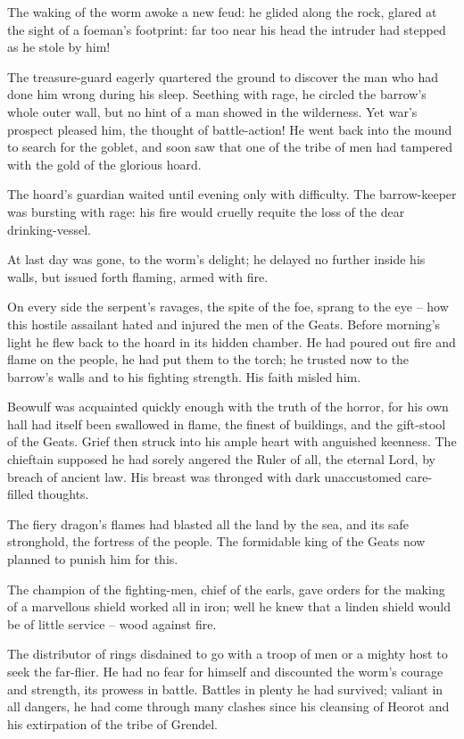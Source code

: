 \documentclass[a4paper]{article}
\begin{document}
{The waking of the worm awoke a new feud:
he glided along the rock, glared at the sight
of a foeman’s footprint: far too near his head
the intruder had stepped as he stole by him!

The treasure-guard eagerly
quartered the ground to discover the man
who had done him wrong during his sleep.
Seething with rage, he circled the barrow’s
whole outer wall, but no hint of a man
showed in the wilderness. Yet war’s prospect pleased him,
the thought of battle-action! He went back into the mound
to search for the goblet, and soon saw that one
of the tribe of men had tampered with the gold
of the glorious hoard.

The hoard’s guardian
waited until evening only with difficulty.
The barrow-keeper was bursting with rage:
his fire would cruelly requite the loss
of the dear drinking-vessel.

At last day was gone,
to the worm’s delight; he delayed no further
inside his walls, but issued forth flaming,
armed with fire.

On every side the serpent’s ravages,
the spite of the foe, sprang to the eye –
how this hostile assailant hated and injured
the men of the Geats. Before morning’s light
he flew back to the hoard in its hidden chamber.
He had poured out fire and flame on the people,
he had put them to the torch; he trusted now to the barrow’s walls
and to his fighting strength. His faith misled him.

Beowulf was acquainted quickly enough
with the truth of the horror, for his own hall had itself
been swallowed in flame, the finest of buildings,
and the gift-stool of the Geats. Grief then struck
into his ample heart with anguished keenness.
The chieftain supposed he had sorely angered
the Ruler of all, the eternal Lord,
by breach of ancient law. His breast was thronged
with dark unaccustomed care-filled thoughts.

The fiery dragon’s flames had blasted
all the land by the sea, and its safe stronghold,
the fortress of the people. The formidable king
of the Geats now planned to punish him for this.

The champion of the fighting-men, chief of the earls,
gave orders for the making of a marvellous shield
worked all in iron; well he knew
that a linden shield would be of little service
– wood against fire. 

The distributor of rings disdained to go
with a troop of men or a mighty host
to seek the far-flier. He had no fear for himself
and discounted the worm’s courage and strength,
its prowess in battle. Battles in plenty
he had survived; valiant in all dangers,
he had come through many clashes since his cleansing of Heorot
and his extirpation of the tribe of Grendel.

}
\end{document}
